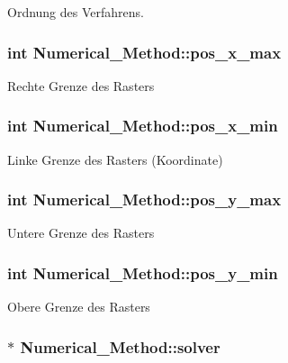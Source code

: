 Ordnung des Verfahrens. \hypertarget{classNumerical__Method_a3d5c5f4b1c31e8b12569cc7bef0710ef}{
\subsubsection[{pos\-\_\-x\-\_\-max}]{\setlength{\rightskip}{0pt plus 5cm}int Numerical\-\_\-\-Method\-::pos\-\_\-x\-\_\-max}}\label{classNumerical__Method_a3d5c5f4b1c31e8b12569cc7bef0710ef}
Rechte Grenze des Rasters \hypertarget{classNumerical__Method_a225e6d56e3b3fac30631bc97d65250da}{
\subsubsection[{pos\-\_\-x\-\_\-min}]{\setlength{\rightskip}{0pt plus 5cm}int Numerical\-\_\-\-Method\-::pos\-\_\-x\-\_\-min}}\label{classNumerical__Method_a225e6d56e3b3fac30631bc97d65250da}
Linke Grenze des Rasters (Koordinate) \hypertarget{classNumerical__Method_acb20f8b0ee0e8ef5e18f8c02037bc4cb}{
\subsubsection[{pos\-\_\-y\-\_\-max}]{\setlength{\rightskip}{0pt plus 5cm}int Numerical\-\_\-\-Method\-::pos\-\_\-y\-\_\-max}}\label{classNumerical__Method_acb20f8b0ee0e8ef5e18f8c02037bc4cb}
Untere Grenze des Rasters \hypertarget{classNumerical__Method_a4d01637ef8b385ce84838349e944077a}{
\subsubsection[{pos\-\_\-y\-\_\-min}]{\setlength{\rightskip}{0pt plus 5cm}int Numerical\-\_\-\-Method\-::pos\-\_\-y\-\_\-min}}\label{classNumerical__Method_a4d01637ef8b385ce84838349e944077a}
Obere Grenze des Rasters \hypertarget{classNumerical__Method_ace474723e7f6407dea6b099a0f5d82f6}{
\subsubsection[{solver}]{$\ast$ Numerical\-\_\-\-Method\-::solver}}\label{classNumerical__Method_ace474723e7f6407dea6b099a0f5d82f6}
